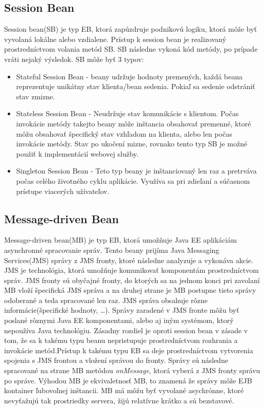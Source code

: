 \subsection{Session Bean}\label{sessionkap}
Session bean(SB) je typ EB, ktorá zapúzdruje podnikovú logiku, ktorá môže byť vyvolaná lokálne alebo vzdialene. Prístup k session bean je realizovaný prostredníctvom volania metód SB. SB následne vykoná kód metódy, po prípade vráti nejaký výsledok. \newline \indent SB môže byť 3 typov:
\begin{itemize}
\item Stateful Session Bean - beany udržuje hodnoty premených, každá beana reprezentuje unikátny stav klienta/bean sedenia. Pokiaľ sa sedenie odstrániť stav zmizne.
\item Stateless Session Bean - Neudržuje stav komunikácie s klientom. Počas invokácie metódy takejto beany môže inštancia obsahovať premenné, ktoré môžu obsahovať špecifický stav vzhľadom na klienta, alebo len počas invokácie metódy. Stav po ukočení mizne, rovnako tento typ SB je možné použiť k implementácií webovej služby.
\item Singleton Session Bean - Teto typ beany je inštanciovaný len raz a pretrváva počas celého životného cyklu aplikácie. Využíva sa pri zdieľaní a súčasnom prístupe viacerých užívateľov.
\end{itemize}

\subsection{Message-driven Bean}\label{messagekap}
Message-driven bean(MB) je typ EB, ktorá umožňuje Java EE aplikáciám asynchronné spracovanie správ. Tento beany prijíma Java Messaging Services(JMS) správy z JMS fronty, ktoré následne analyzuje a vykonáva akcie\cite{jmsbook}. JMS je technológia, ktorá umožňuje komunikovať komponentám prostredníctvom správ. JMS fronty sú obyčajné fronty, do ktorých sa na jednom konci pri zavolaní MB vloží špecifická JMS správa a na druhej strane je MB postupne tieto správy odoberané a teda spracované len raz. JMS správa obsahuje rôzne informácie(špecifické hodnoty, \ldots). Správy zaradené v JMS fronte môžu byť poslané rôznymi Java EE komponentami, alebo aj iným systémom, ktorý nepoužíva Java technológiu. Zásadny rozdiel je oproti session bean v zásade v tom, že sa k takému  typu beanu nepristupuje prostredníctvom rozhrania a invokácie metód.Prístup k takému typu EB sa deje prostredníctvom vytvorenia spojenia s JMS frontou a vložení správou do fronty. Správy sú následne spracované na strane MB metódou \emph{onMessage}, ktorá vyberá z JMS fronty správu po správe. Výhodou MB je ekvivaletnosť MB, to znamená že správy môže EJB kontainer ľubovoľnej inštancii. MB má môžu byť vyvolané asychrónne, ktoré nevyťažujú tak prostriedky servera, žijú relatívne krátko a sú bezstavové. 

